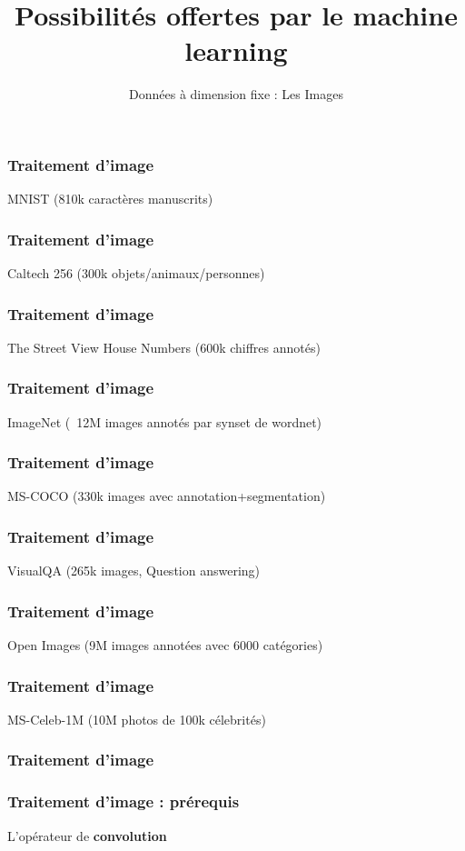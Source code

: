 \documentclass{formation}
\title{Possibilités offertes par le machine learning}
\subtitle{Données à dimension fixe : Les Images}
\begin{document}
\maketitle

\begin{frame}
  \frametitle{Traitement d'image}
  MNIST (810k caractères manuscrits)
\end{frame}

\begin{frame}
  \frametitle{Traitement d'image}
  Caltech 256 (300k objets/animaux/personnes)
\end{frame}

\begin{frame}
  \frametitle{Traitement d'image}
  The Street View House Numbers (600k chiffres annotés)
\end{frame}

\begin{frame}
  \frametitle{Traitement d'image}
  ImageNet (~12M images annotés par synset de wordnet)
\end{frame}

\begin{frame}
  \frametitle{Traitement d'image}
  MS-COCO (330k images avec annotation+segmentation)
\end{frame}

\begin{frame}
  \frametitle{Traitement d'image}
  VisualQA (265k images, Question answering)
\end{frame}

\begin{frame}
  \frametitle{Traitement d'image}
  Open Images (9M images annotées avec 6000 catégories)
\end{frame}

\begin{frame}
  \frametitle{Traitement d'image}
  MS-Celeb-1M (10M photos de 100k célebrités)
\end{frame}

\begin{frame}
  \frametitle{Traitement d'image}
  \begin{center}
  \end{center}
\end{frame}

\begin{frame}
  \frametitle{Traitement d'image : prérequis}
  L'opérateur de \textbf{convolution}
\end{frame}
\end{document}
